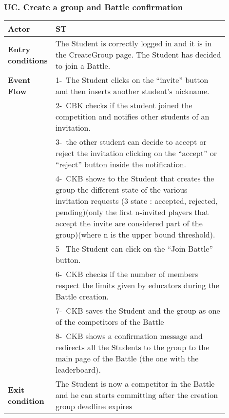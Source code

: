 \subsubsection*{UC\cuc . Create a group and Battle confirmation}
\begin{center}
    \begin{longtable}{|l|p{0.9\linewidth}|}
        \hline
        \textbf{Actor}            & ST                                                                                                                                                                                        \\
        \hline
        \textbf{Entry conditions} & The Student is correctly logged in and it is in the CreateGroup page. The Student has decided to join a Battle.        \\
        \hline
        \textbf{Event Flow}       & 1-\ The Student clicks on the “invite” button and then inserts another student’s nickname.        \\
        & 2-\ CBK checks if the student joined the competition and notifies other students of an invitation.          \\
        & 3-\ the other student can decide to accept or reject the invitation clicking on the “accept” or “reject” button inside the notification.        \\
        & 4-\ CKB shows to the Student that creates the group the different state of the various invitation requests (3 state : accepted, rejected, pending)(only the first n-invited players that accept the invite are considered part of the group)(where n is the upper bound threshold).         \\
        & 5-\ The Student can click on the “Join Battle” button.        \\
        & 6-\ CKB checks if the number of members respect the limits given by educators during the Battle creation.         \\
        & 7-\ CKB saves the Student and the group as one of the competitors of the Battle        \\
        & 8-\ CKB shows a confirmation message and redirects all the Students to the group to the main page of the Battle (the one with the leaderboard).        \\
        \hline
        \textbf{Exit condition}   & The Student is now a competitor in the Battle and he can starts committing after the creation group deadline expires        \\
        \hline

\end{longtable}
\end{center}
